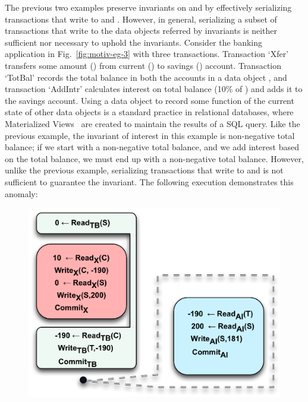 The previous two examples preserve invariants on  and  by
effectively serializing transactions that write to  and .
However, in general, serializing a subset of transactions that write
to the data objects referred by invariants is neither sufficient nor
necessary to uphold the invariants. Consider the banking application
in Fig.~\ref{fig:motiv-eg-3} with three transactions. Transaction
`Xfer' transfers some amount () from current () to savings
() account.  Transaction `TotBal' records the total balance in
both the accounts in a data object , and transaction `AddIntr'
calculates interest on total balance (10\% of ) and adds it to
the savings account. Using a data object to record some function of
the current state of other data objects is a standard practice in
relational databases, where Materialized Views~\cite{oraclematview}
are created to maintain the results of a SQL query. Like the previous
example, the invariant of interest in this example is non-negative
total balance; if we start with a non-negative total balance, and we
add interest based on the total balance, we must end up with a
non-negative total balance.  However, unlike the previous example,
serializing transactions that write to  and  is not
sufficient to guarantee the invariant.  The following execution
demonstrates this anomaly:

\begin{figure}[!h]
\centering
\includegraphics[scale=0.5]{Figures/motiv-eg-3-a}

\label{fig:motiv-eg-3-a}
\end{figure}

